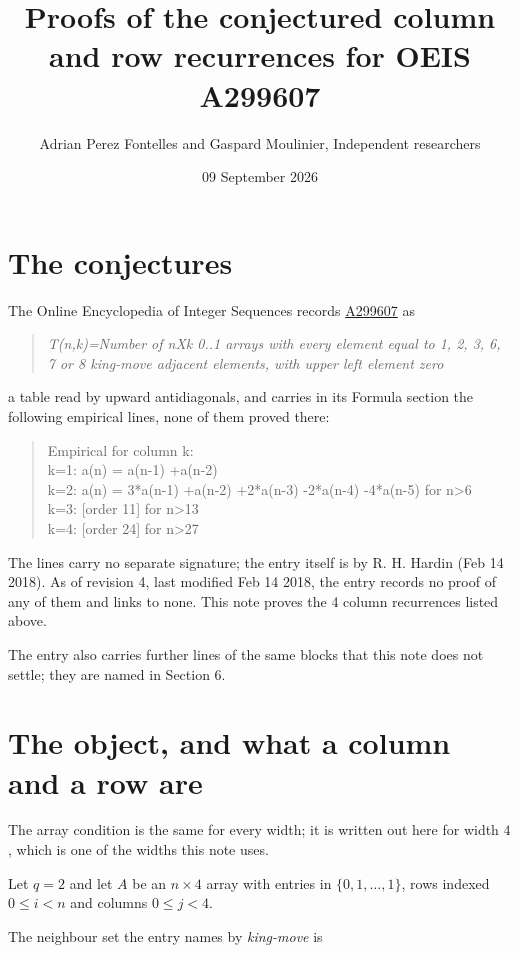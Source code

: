 \documentclass[11pt]{article}
\title{Proofs of the conjectured column and row recurrences for OEIS A299607}
\author{Adrian Perez Fontelles and Gaspard Moulinier, Independent researchers}
\date{09 September 2026}
\theoremstyle{definition}
\begin{document}
\maketitle
\section{The conjectures}

The Online Encyclopedia of Integer Sequences records \href{https://oeis.org/A299607}{A299607} as

\begin{quote}\itshape T(n,k)=Number of nXk 0..1 arrays with every element equal to 1, 2, 3, 6, 7 or 8 king-move adjacent elements, with upper left element zero\end{quote}

a table read by upward antidiagonals, and carries in its Formula section the following empirical lines, none of them proved there:

\begin{quote}\ttfamily Empirical for column k:\\
k=1: a(n) = a(n-1) +a(n-2)\\k=2: a(n) = 3*a(n-1) +a(n-2) +2*a(n-3) -2*a(n-4) -4*a(n-5) for n>6\\k=3: [order 11] for n>13\\k=4: [order 24] for n>27\end{quote}

The lines carry no separate signature; the entry itself is by R. H. Hardin (Feb 14 2018). As of revision 4, last modified Feb 14 2018, the entry records no proof of any of them and links to none. This note proves the 4 column recurrences listed above.

The entry also carries further lines of the same blocks that this note does not settle; they are named in Section 6.

\section{The object, and what a column and a row are}

The array condition is the same for every width; it is written out here for width $4$, which is one of the widths this note uses.

Let $q = 2$ and let $A$ be an $n \times 4$ array with entries in $\{0,1,\dots,1\}$, rows indexed $0 \le i < n$ and columns $0 \le j < 4$.

The neighbour set the entry names by {\itshape king-move} is
\end{document}
